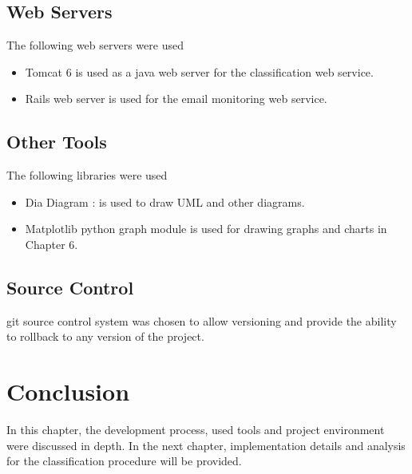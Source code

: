 \subsection{Web Servers}
The following web servers were used
\begin{itemize}
  \item Tomcat 6 is used as a java web server for the classification web service.
  \item Rails web server is used for the email monitoring web service.
\end{itemize}

\subsection{Other Tools}
The following libraries were used
\begin{itemize}
  \item Dia Diagram : is used to draw UML and other diagrams.
  \item Matplotlib python graph module is used for drawing graphs and charts in Chapter 6.
\end{itemize}

\subsection{Source Control}
git source control system \cite{GIT} was chosen to allow versioning and provide 
the ability to rollback to any version of the project.
\section{Conclusion}
\label{sec:conclusion_5}
In this chapter, the development process, used tools and project environment were 
discussed in depth. In the next chapter, implementation details and analysis for the classification 
procedure will be provided.
